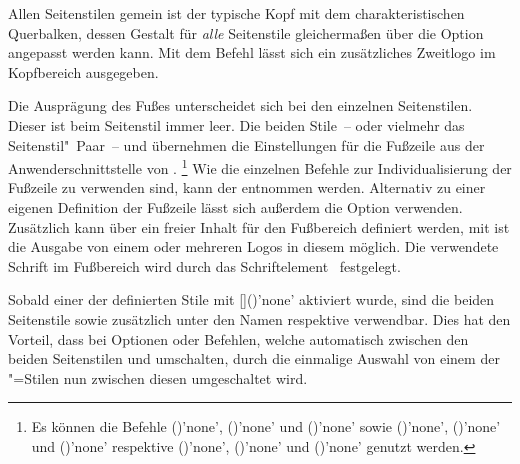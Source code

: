 \begin{Declaration*}{}
\begin{Declaration*}{}
\begin{Declaration*}{}
\begin{Declaration}[v2.02]{}
\begin{Declaration}[v2.02]{}
\begin{Declaration}[v2.02]{}
Allen Seitenstilen gemein ist der typische Kopf mit dem charakteristischen 
Querbalken, dessen Gestalt für \emph{alle} Seitenstile gleichermaßen über die 
Option  angepasst werden kann. Mit dem Befehl  
lässt sich ein zusätzliches Zweitlogo im Kopfbereich ausgegeben.

Die Ausprägung des Fußes unterscheidet sich bei den einzelnen Seitenstilen. 
Dieser ist beim Seitenstil  immer leer. Die beiden 
Stile~-- oder vielmehr das Seitenstil"~Paar~--  und 
 übernehmen die Einstellungen für die Fußzeile aus 
der Anwenderschnittstelle von .%
\footnote{%
  Es können die Befehle
  ()'none', 
  ()'none' und 
  ()'none' sowie 
  ()'none', 
  ()'none' und 
  ()'none' respektive 
  ()'none', 
  ()'none' und 
  ()'none'
  genutzt werden.%
}
Wie die einzelnen Befehle zur Individualisierung der Fußzeile zu verwenden 
sind, kann der  entnommen werden. Alternativ 
zu einer eigenen Definition der Fußzeile lässt sich außerdem die Option 
 verwenden. Zusätzlich kann über  ein freier 
Inhalt für den Fußbereich definiert werden, mit  ist die 
Ausgabe von einem oder mehreren Logos in diesem möglich. Die verwendete Schrift 
im Fußbereich wird durch das Schriftelement~ festgelegt.

Sobald einer der definierten Stile mit 
[]()'none' aktiviert 
wurde, sind die beiden Seitenstile  sowie 
 zusätzlich unter den Namen  
respektive  verwendbar. Dies hat den Vorteil, dass bei 
Optionen oder Befehlen, welche automatisch zwischen den beiden Seitenstilen 
 und  umschalten, durch die einmalige 
Auswahl von einem der "=Stilen nun zwischen diesen 
umgeschaltet wird.


\end{Declaration}
\end{Declaration}
\end{Declaration}
\end{Declaration*}
\end{Declaration*}
\end{Declaration*}
